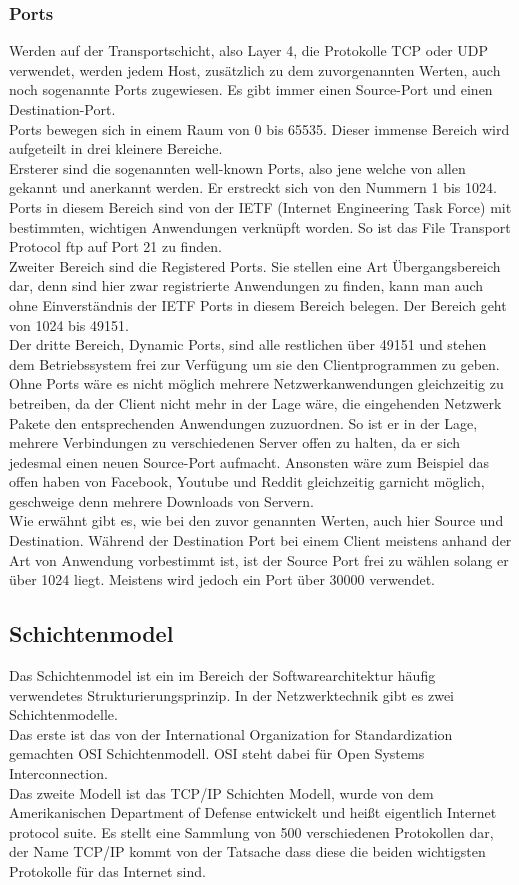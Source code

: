 \documentclass[12pt,a4paper]{report}
\begin{document}
\subsubsection{Ports}
Werden auf der Transportschicht, also Layer 4, die Protokolle TCP oder UDP verwendet, werden jedem Host, zusätzlich zu dem zuvorgenannten Werten, auch noch sogenannte Ports zugewiesen. Es gibt immer einen Source-Port und einen Destination-Port.\\
Ports bewegen sich in einem Raum von 0 bis 65535. Dieser immense Bereich wird aufgeteilt in drei kleinere Bereiche.\\
Ersterer sind die sogenannten well-known Ports, also jene welche von allen gekannt und anerkannt werden. Er erstreckt sich von den Nummern 1 bis 1024. Ports in diesem Bereich sind von der IETF (Internet Engineering Task Force) mit bestimmten, wichtigen Anwendungen verknüpft worden. So ist das File Transport Protocol ftp auf Port 21 zu finden.\\
Zweiter Bereich sind die Registered Ports. Sie stellen eine Art Übergangsbereich dar, denn sind hier zwar registrierte Anwendungen zu finden, kann man auch ohne Einverständnis der IETF Ports in diesem Bereich belegen. Der Bereich geht von 1024 bis 49151.\\
Der dritte Bereich, Dynamic Ports, sind alle restlichen über 49151 und stehen dem Betriebssystem frei zur Verfügung um sie den Clientprogrammen zu geben.\\

Ohne Ports wäre es nicht möglich mehrere Netzwerkanwendungen gleichzeitig zu betreiben, da der Client nicht mehr in der Lage wäre, die eingehenden Netzwerk Pakete den entsprechenden Anwendungen zuzuordnen. So ist er in der Lage, mehrere Verbindungen zu verschiedenen Server offen zu halten, da er sich jedesmal einen neuen Source-Port aufmacht. Ansonsten wäre zum Beispiel das offen haben von Facebook, Youtube und Reddit gleichzeitig garnicht möglich, geschweige denn mehrere Downloads von Servern.\\

Wie erwähnt gibt es, wie bei den zuvor genannten Werten, auch hier Source und Destination. Während der Destination Port bei einem Client meistens anhand der Art von Anwendung vorbestimmt ist, ist der Source Port frei zu wählen solang er über 1024 liegt. Meistens wird jedoch ein Port über 30000 verwendet. 
\subsection{Schichtenmodel}
Das Schichtenmodel ist ein im Bereich der Softwarearchitektur häufig verwendetes Strukturierungsprinzip. In der Netzwerktechnik gibt es zwei Schichtenmodelle.\\
Das erste ist das von der International Organization for Standardization gemachten OSI Schichtenmodell. OSI steht dabei für Open Systems Interconnection.\\
Das zweite Modell ist das TCP/IP Schichten Modell, wurde von dem Amerikanischen Department of Defense entwickelt und heißt eigentlich Internet protocol suite. Es stellt eine Sammlung von 500 verschiedenen Protokollen dar, der Name TCP/IP kommt von der Tatsache dass diese die beiden wichtigsten Protokolle für das Internet sind. 
\end{document}
